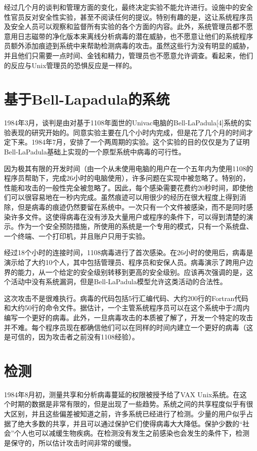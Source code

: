 经过几个月的谈判和管理方面的变化，最终决定实验不能允许进行。设施中的安全性官员反对安全性实验，甚至不阅读任何的提议。特别有趣的是，这让系统程序员及安全人员可以观察和监督所有实验的各个方面的内容。此外，系统管理员都不愿意用日志磁带的净化版本来离线分析病毒的潜在威胁，也不愿意让他们的系统程序员额外添加痕迹到系统中来帮助检测病毒的攻击。虽然这些行为没有明显的威胁，并且他们只需要一点时间、金钱和精力，管理员也不愿意允许调查。看起来，他们的反应与Unix管理员的恐惧反应是一样的。


\section{基于Bell-Lapadula的系统}

1984年3月，谈判是由对基于1108年面世的Univac电脑的Bell-LaPadula[4]系统的实验表现的研究开始的。同意实验主要在几个小时内完成，但是花了几个月的时间才定下来。1984年7月，安排了一个两周期的实验。这个实验的目的仅仅是为了证明Bell-LaPadula基础上实现的一个原型系统中病毒的可行性。

因为极其有限的开发时间（由一个从未使用电脑的用户在一个五年内为使用1108的程序员帮助下，完成26小时的电脑使用），许多问题在实现中被忽略了。特别的，性能和攻击的一般性完全被忽略了。因此，每个感染需要花费约20秒时间，即使他们可以很容易地在一秒内完成。虽然痕迹可以用很少的经历在很大程度上得到消除，但是病毒的痕迹仍然要留在系统中。一次只有一个文件被感染，而不是同时感染许多文件。这使得病毒在没有涉及大量用户或程序的条件下，可以得到清楚的演示。作为一个安全预防措施，所使用的系统是一个专用的模式，只有一个系统盘、一个终端、一个打印机，并且账户只用于实验。


经过18个小时的连接时间，1108病毒进行了首次感染。在26小时的使用后，病毒是演示给了大约10个人，其中包括管理员、程序员和安保人员。病毒演示了跨用户边界的能力，从一个给定的安全级别转移到更高的安全级别。应该再次强调的是，这个活动中没有系统漏洞，但是Bell-LaPadula模型允许这类活动的合法性。


这次攻击不是很难执行。病毒的代码包括5行汇编代码、大约200行的Fortran代码和大约50行的命令文件。据估计，一个主管系统程序员可以在这个系统中于2周内编写一个更好的病毒。此外，一旦病毒攻击的本质被了解了，开发一个特定的攻击并不难。每个程序员现在都确信他们可以在同样的时间内建立一个更好的病毒（这是可信的，因为攻击者之前没有1108经验）。

\section{检测}

1984年8月初，测量共享和分析病毒蔓延的权限被授予给了VAX Unix系统。在这个时期的数据是非常有限的，但是出现了一些趋势。系统之间的共享程度似乎有很大区别，并且这些偏差被知道之前，许多系统已经进行了检测。少量的用户似乎占据了绝大多数的共享，并且可以通过保护它们使得病毒大大降低。保护少数的“社会”个人也可以减缓生物疾病。在检测没有发生之前感染也会发生的条件下，检测是保守的，所以估计攻击时间非常的缓慢。


